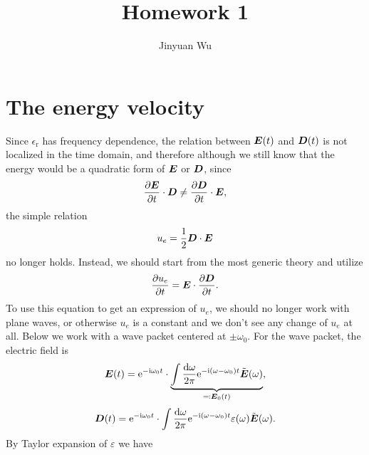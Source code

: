 \documentclass[hyperref, a4paper]{article}
\title{Homework 1}
\author{Jinyuan Wu}
\newcommand*{\ii}{\mathrm{i}}
\newcommand*{\ee}{\mathrm{e}}
\newcommand{\epsr}{\epsilon_{\text{r}}}
\newcommand{\Efreq}{\tilde{\vb*{E}}}
\begin{document}
\maketitle

\section{The energy velocity}

Since $\epsr$ has frequency dependence,
the relation between $\vb*{E}(t)$ and $\vb*{D}(t)$ 
is not localized in the time domain,
and therefore although we still know that 
the energy would be a quadratic form of $\vb*{E}$ or $\vb*{D}$,
since 
\begin{equation}
    \pdv{\vb*{E}}{t} \cdot \vb*{D} \neq \pdv{\vb*{D}}{t} \cdot \vb*{E},
\end{equation}
the simple relation 
\[
    u_e = \frac{1}{2} \vb*{D} \cdot \vb*{E} 
\]
no longer holds.
Instead, we should start from the most generic theory 
and utilize 
\begin{equation}
    \pdv{u_e}{t} = \vb*{E} \cdot \pdv{\vb*{D}}{t}.
    \label{eq:change-of-ue}
\end{equation} 
To use this equation to get an expression of $u_e$,
we should no longer work with plane waves, 
or otherwise $u_e$ is a constant and 
we don't see any change of $u_e$ at all.
Below we work with a wave packet centered at $\pm \omega_0$.
For the wave packet, the electric field is 
\begin{equation}
    \vb*{E}(t) = \ee^{- \ii \omega_0 t} \cdot 
        \underbrace{
            \int \frac{\dd{\omega}}{2\pi} \ee^{- \ii (\omega - \omega_0) t}
            \Efreq(\omega)
        }_{\eqqcolon \vb*{E}_0(t)},
\end{equation}
\begin{equation}
    \vb*{D}(t) = \ee^{- \ii \omega_0 t} \cdot 
        \int \frac{\dd{\omega}}{2\pi} \ee^{- \ii (\omega - \omega_0) t}
            \varepsilon(\omega) \Efreq(\omega) .
\end{equation}
By Taylor expansion of $\varepsilon$ we have 
\end{document}
